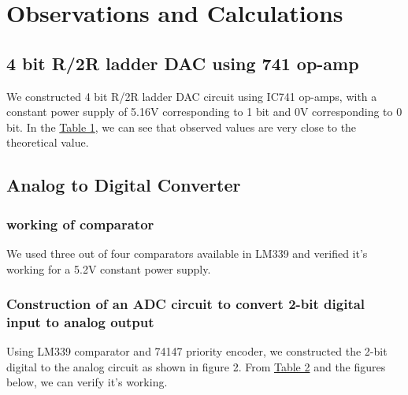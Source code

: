 \section{Observations and Calculations}
	\subsection{ 4 bit R/2R ladder DAC using 741 op-amp  }
		We constructed  4 bit R/2R ladder DAC circuit using IC741 op-amps, with a constant power supply of 5.16V corresponding to 1 bit and 0V corresponding to 0 bit. In the \hyperref[tab:1]{Table 1}, we can see that observed values are very close to the theoretical value.

		

	\subsection{Analog to Digital Converter}
		\subsubsection{working of comparator}
			We used three out of four comparators available in LM339 and verified it's working for a 5.2V constant power supply.
			

			\subsubsection{Construction of an ADC circuit to convert 2-bit digital input to analog output}
				Using LM339 comparator and 74147 priority encoder, we constructed the 2-bit digital to the analog circuit as shown in figure 2. From \hyperref[tab:2]{Table 2} and the figures below, we can verify it's working.

